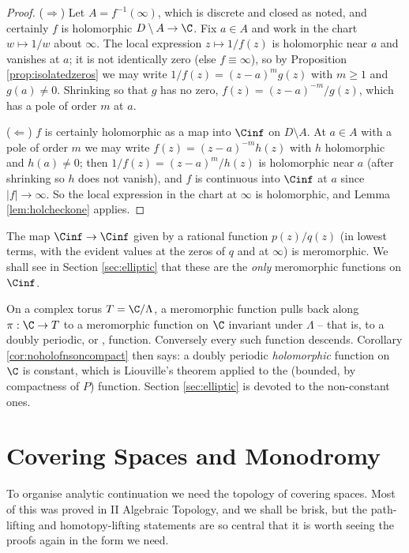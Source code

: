 \begin{proof}
	($\Rightarrow$) Let $A = f^{-1}(\infty)$, which is discrete and closed as noted, and
	certainly $f$ is holomorphic $D \setminus A \to \C$. Fix $a \in A$ and work in the chart
	$w \mapsto 1/w$ about $\infty$. The local expression $z \mapsto 1/f(z)$ is holomorphic
	near $a$ and vanishes at $a$; it is not identically zero (else $f \equiv \infty$), so by
	Proposition \ref{prop:isolatedzeros} we may write $1/f(z) = (z-a)^m g(z)$ with $m \geq 1$
	and $g(a) \neq 0$. Shrinking so that $g$ has no zero, $f(z) = (z-a)^{-m}/g(z)$, which
	has a pole of order $m$ at $a$.

	($\Leftarrow$) $f$ is certainly holomorphic as a map into $\Cinf$ on $D \setminus A$.
	At $a \in A$ with a pole of order $m$ we may write $f(z) = (z-a)^{-m}h(z)$ with $h$
	holomorphic and $h(a)\neq 0$; then $1/f(z) = (z-a)^m/h(z)$ is holomorphic near $a$
	(after shrinking so $h$ does not vanish), and $f$ is continuous into $\Cinf$ at $a$
	since $|f| \to \infty$. So the local expression in the chart at $\infty$ is holomorphic,
	and Lemma \ref{lem:holcheckone} applies.
\end{proof}

\begin{example}
	The map $\Cinf \to \Cinf$ given by a rational function $p(z)/q(z)$ (in lowest terms,
	with the evident values at the zeros of $q$ and at $\infty$) is meromorphic. We shall
	see in Section \ref{sec:elliptic} that these are the \emph{only} meromorphic functions
	on $\Cinf$.
\end{example}

\begin{example}
	On a complex torus $T = \C/\Lambda$, a meromorphic function pulls back along
	$\pi : \C \to T$ to a meromorphic function on $\C$ invariant under $\Lambda$ -- that
	is, to a doubly periodic, or , function. Conversely every such function
	descends. Corollary \ref{cor:noholofnsoncompact} then says: a doubly periodic
	\emph{holomorphic} function on $\C$ is constant, which is Liouville's theorem applied
	to the (bounded, by compactness of $P$) function. Section \ref{sec:elliptic} is devoted
	to the non-constant ones.
\end{example}

\section{Covering Spaces and Monodromy}

To organise analytic continuation we need the topology of covering spaces. Most of this
was proved in II Algebraic Topology, and we shall be brisk, but the path-lifting and
homotopy-lifting statements are so central that it is worth seeing the proofs again in
the form we need.

